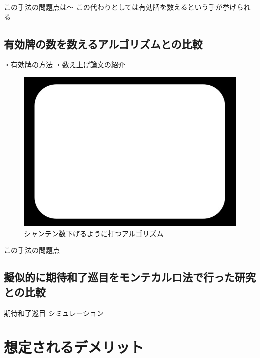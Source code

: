 この手法の問題点は〜
この代わりとしては有効牌を数えるという手が挙げられる

\subsection{有効牌の数を数えるアルゴリズムとの比較}
・有効牌の方法
・数え上げ論文の紹介

\begin{figure}[h]
 \centering
 \includegraphics[keepaspectratio, scale=0.5,bb=0 0 620 439]
      {img/zu.jpg}
 \caption{シャンテン数下げるように打つアルゴリズム}
 \label{zu}
\end{figure}

この手法の問題点


\subsection{擬似的に期待和了巡目をモンテカルロ法で行った研究との比較}
期待和了巡目
シミュレーション


\section{想定されるデメリット}




